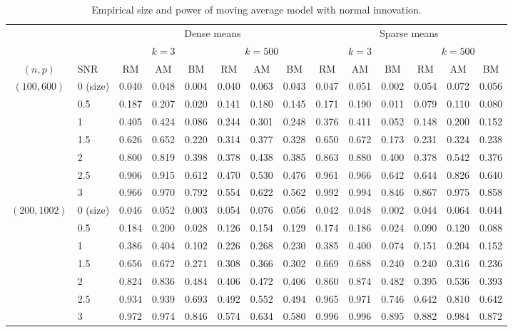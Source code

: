 \documentclass[3p]{elsarticle}
\theoremstyle{plain}
\theoremstyle{definition}
\theoremstyle{remark}
\begin{document}
\begin{table}[ht]
    \caption{Empirical size and power of moving average model with normal innovation.
    }
\label{table1}
\footnotesize
    \centering
    \begin{tabular}{clcccccccccccc}
          \toprule
          & & \multicolumn{6}{c}{Dense means} &\multicolumn{6}{c}{Sparse means}\\
          \cmidrule(r){3-8}\cmidrule(r){9-14}
          & & \multicolumn{3}{c}{$k=3$} & \multicolumn{3}{c}{$k=500$} & \multicolumn{3}{c}{$k=3$}& \multicolumn{3}{c}{$k=500$}\\
          \cmidrule(r){3-5}  \cmidrule(r){6-8} \cmidrule(r){9-11}  \cmidrule(r){12-14}
           $(n,p)$&SNR & RM & AM & BM & RM & AM & BM & RM & AM & BM & RM & AM & BM  \\ 
            \midrule
        $(100, 600)$ &0 (size)& 0.040 & 0.048 & 0.004 & 0.040 & 0.063 & 0.043 & 0.047 & 0.051 & 0.002 & 0.054 & 0.072 & 0.056 \\ 
&0.5 & 0.187 & 0.207 & 0.020 & 0.141 & 0.180 & 0.145 & 0.171 & 0.190 & 0.011 & 0.079 & 0.110 & 0.080 \\ 
&1 & 0.405 & 0.424 & 0.086 & 0.244 & 0.301 & 0.248 & 0.376 & 0.411 & 0.052 & 0.148 & 0.200 & 0.152 \\ 
&1.5 & 0.626 & 0.652 & 0.220 & 0.314 & 0.377 & 0.328 & 0.650 & 0.672 & 0.173 & 0.231 & 0.324 & 0.238 \\ 
&2 & 0.800 & 0.819 & 0.398 & 0.378 & 0.438 & 0.385 & 0.863 & 0.880 & 0.400 & 0.378 & 0.542 & 0.376 \\ 
&2.5 & 0.906 & 0.915 & 0.612 & 0.470 & 0.530 & 0.476 & 0.961 & 0.966 & 0.642 & 0.644 & 0.826 & 0.640 \\ 
&3 & 0.966 & 0.970 & 0.792 & 0.554 & 0.622 & 0.562 & 0.992 & 0.994 & 0.846 & 0.867 & 0.975 & 0.858 \\ 
        \midrule
$(200,1002)$&0 (size) & 0.046 & 0.052 & 0.003 & 0.054 & 0.076 & 0.056 & 0.042 & 0.048 & 0.002 & 0.044 & 0.064 & 0.044 \\
&0.5 & 0.184 & 0.200 & 0.028 & 0.126 & 0.154 & 0.129 & 0.174 & 0.186 & 0.024 & 0.090 & 0.120 & 0.088 \\
&1 & 0.386 & 0.404 & 0.102 & 0.226 & 0.268 & 0.230 & 0.385 & 0.400 & 0.074 & 0.151 & 0.204 & 0.152 \\
&1.5 & 0.656 & 0.672 & 0.271 & 0.308 & 0.366 & 0.302 & 0.669 & 0.688 & 0.240 & 0.240 & 0.316 & 0.236 \\
&2 & 0.824 & 0.836 & 0.484 & 0.406 & 0.472 & 0.406 & 0.860 & 0.874 & 0.482 & 0.395 & 0.536 & 0.393 \\
&2.5 & 0.934 & 0.939 & 0.693 & 0.492 & 0.552 & 0.494 & 0.965 & 0.971 & 0.746 & 0.642 & 0.810 & 0.642 \\
&3 & 0.972 & 0.974 & 0.846 & 0.574 & 0.634 & 0.580 & 0.996 & 0.996 & 0.895 & 0.882 & 0.984 & 0.872 \\


\end{tabular}
\end{table}
\end{document}
